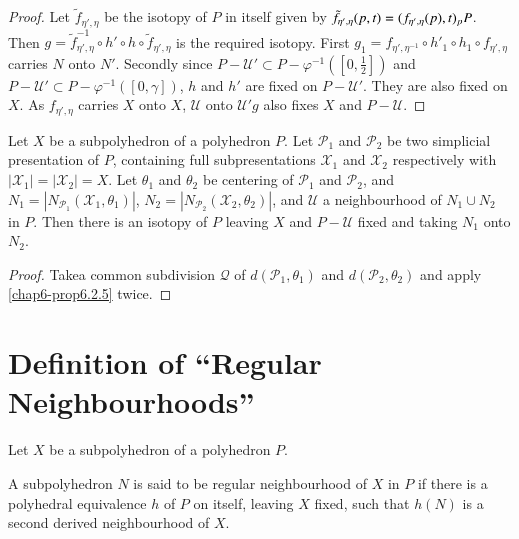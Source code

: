 \begin{proof}
Let $\tilde{f}_{\eta',\eta}$ be the isotopy of $P$ in itself given by
$\tilde{f}_{\eta',\eta}(p,t)=(f_{\eta',\eta}(p),\break t)_{p} P$. Then $g=\tilde{f}_{\eta',\eta}^{-1}\circ h'\circ h\circ \tilde{f}_{\eta',\eta}$ is the required isotopy. First $g_{1}=f_{\eta',\eta^{-1}}\circ h'_{1}\circ h_{1}\circ f_{\eta',\eta}$ carries $N$ onto $N'$. Secondly since $P-\mathscr{U}'\subset P-\varphi^{-1}([0,\frac{1}{2}])$ and $P-\mathscr{U}'\subset P-\varphi^{-1}([0,\gamma])$, $h$ and $h'$ are fixed on $P-\mathscr{U}'$. They are also fixed on $X$. As $f_{\eta',\eta}$ carries $X$ onto $X$, $\mathscr{U}$ onto $\mathscr{U}'g$ also fixes $X$ and $P-\mathscr{U}$. 
\end{proof}

\begin{corollary}\label{chap6-coro6.2.6}
Let $X$ be a subpolyhedron of a polyhedron $P$. Let $\mathscr{P}_{1}$ and $\mathscr{P}_{2}$ be two simplicial presentation of $P$, containing full subpresentations $\mathscr{X}_{1}$ and $\mathscr{X}_{2}$ respectively with $|\mathscr{X}_{1}|=|\mathscr{X}_{2}|=X$. Let $\theta_{1}$ and $\theta_{2}$ be centering of $\mathscr{P}_{1}$ and $\mathscr{P}_{2}$, and $N_{1}=|N_{\mathscr{P}_{1}}(\mathscr{X}_{1},\theta_{1})|$, $N_{2}=|N_{\mathscr{P}_{2}}(\mathscr{X}_{2},\theta_{2})|$, and $\mathscr{U}$ a neighbourhood of $N_{1}\cup N_{2}$ in $P$. Then there is an isotopy of $P$ leaving $X$ and $P-\mathscr{U}$ fixed and taking $N_{1}$ onto $N_{2}$. 
\end{corollary}

\begin{proof}
Take\pageoriginale a common subdivision $\mathcal{Q}$ of $d(\mathscr{P}_{1},\theta_{1})$ and $d(\mathscr{P}_{2},\theta_{2})$ and apply \ref{chap6-prop6.2.5} twice. 
\end{proof}

\section{Definition of ``Regular Neighbourhoods''}\label{chap6-sec6.3}

Let $X$ be a subpolyhedron of a polyhedron $P$.

\begin{definition}\label{chap6-defi6.3.1}
A subpolyhedron $N$ is said to be regular neighbourhood of $X$ in $P$ if there is a polyhedral equivalence $h$ of $P$ on itself, leaving $X$ fixed, such that $h(N)$ is a second derived neighbourhood of $X$.
\end{definition}

